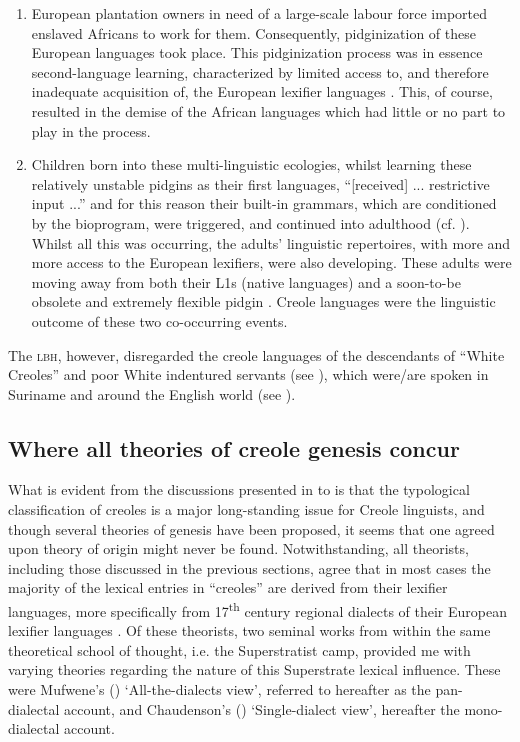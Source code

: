 \begin{enumerate}
\item European plantation owners in need of a large-scale labour force imported enslaved Africans to work for them. Consequently, pidginization of these European languages took place. This pidginization process was in essence second-language learning, characterized by limited access to, and therefore inadequate acquisition of, the European lexifier languages \citep{Bickerton77}. This, of course, resulted in the demise of the African languages which had little or no part to play in the process.
\item Children born into these multi-linguistic ecologies, whilst learning these relatively unstable pidgins \citep[49]{Bickerton77}  as their first languages, ``[received] ... restrictive input ...'' and for this reason their  built-in grammars, which are conditioned by the bioprogram, were triggered, and continued into adulthood (cf. \citealt{Bickerton79, Bickerton84, Bickerton81}). Whilst all this was occurring, the adults' linguistic repertoires, with more and more access to the European lexifiers, were also developing. These adults were moving away from both their L1s (native languages) and a soon-to-be obsolete and extremely flexible pidgin \citep{Bickerton81}. Creole languages were the linguistic outcome of these two co-occurring events.
\end{enumerate}

The \textsc{lbh}, however, disregarded the creole languages of the descendants of ``White Creoles'' and poor White indentured servants (see \citealt{Schumann83, Cassidy82}), which were/are spoken in Suriname and around the English world (see \citealt{Trudgill02}). 

\subsection {Where all theories of creole genesis concur}\label{2.2.4}
What is evident from the discussions presented in  to  is that the typological classification of creoles is a major long-standing issue for Creole linguists, and though several theories of genesis have been proposed, it seems that one agreed upon theory of origin might never be found. Notwithstanding, all theorists, including those discussed in the previous sections, agree that in most cases the majority of the lexical entries in ``creoles'' are derived from their lexifier languages, more specifically from 17\textsuperscript{th} century regional dialects of their European lexifier languages \citep{Chaudenson92, Chaudenson01, Mufwene96, Mufwene08, Lefebvre04, McWhorter05}. Of these theorists, two seminal works from within the same theoretical school of thought, i.e. the Superstratist camp, provided me with varying theories regarding the nature of this Superstrate lexical influence. These were Mufwene's (\citeyear{Mufwene01, Mufwene08}) `All-the-dialects view', referred to hereafter as the pan-dialectal account, and  Chaudenson's (\citeyear{Chaudenson79, Chaudenson92, Chaudenson01}) `Single-dialect view', hereafter the mono-dialectal account.

